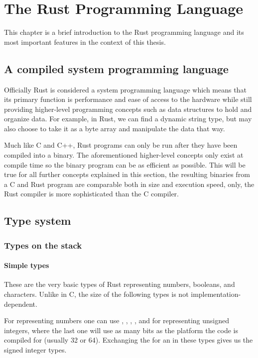 \chapter{The Rust Programming Language}

This chapter is a brief introduction to the Rust programming language and its most important features in the context of this thesis.

\section{A compiled system programming language}

Officially Rust is considered a system programming language which means that its primary function is performance and ease of access to the hardware while still providing higher-level programming concepts such as data structures to hold and organize data. \cite{SystemProgrammingLanguageWikipedia} For example, in Rust, we can find a dynamic string type, but may also choose to take it as a byte array and manipulate the data that way.

Much like C and C++, Rust programs can only be run after they have been compiled into a binary. The aforementioned higher-level concepts only exist at compile time so the binary program can be as efficient as possible. This will be true for all further concepts explained in this section, the resulting binaries from a C and Rust program are comparable both in size and execution speed, only, the Rust compiler is more sophisticated than the C compiler.

\section{Type system}

\subsection{Types on the stack}

\subsubsection{Simple types}

These are the very basic types of Rust representing numbers, booleans, and characters. Unlike in C, the size of the following types is not implementation-dependent.

For representing numbers one can use , , , ,  and  for representing unsigned integers, where the last one will use as many bits as the platform the code is compiled for (usually 32 or 64). Exchanging the  for an  in these types gives us the signed integer types.

